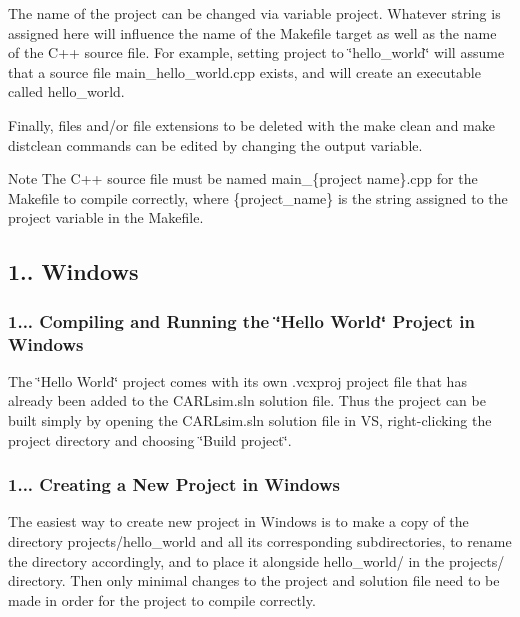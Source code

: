 The name of the project can be changed via variable {\ttfamily project}. Whatever string is assigned here will influence the name of the Makefile target as well as the name of the C++ source file. For example, setting {\ttfamily project} to \char`\"{}hello\+\_\+world\char`\"{} will assume that a source file {\ttfamily main\+\_\+hello\+\_\+world.\+cpp} exists, and will create an executable called {\ttfamily hello\+\_\+world}.

Finally, files and/or file extensions to be deleted with the {\ttfamily make clean} and {\ttfamily make distclean} commands can be edited by changing the {\ttfamily output} variable.

\begin{DoxyNote}{Note}
The C++ source file must be named {\ttfamily main\+\_\+\{project name\}.cpp} for the Makefile to compile correctly, where {\ttfamily \{project\+\_\+name\}} is the string assigned to the {\ttfamily project} variable in the Makefile.
\end{DoxyNote}
\hypertarget{ch1_getting_started_ch1s3s2_windows_project_workflow}{}\subsection{1.. Windows}\label{ch1_getting_started_ch1s3s2_windows_project_workflow}
\hypertarget{ch1_getting_started_ch1s3s2s1_win_hello_world_compile}{}\subsubsection{1... Compiling and Running the \char`\"{}\+Hello World\char`\"{} Project in Windows}\label{ch1_getting_started_ch1s3s2s1_win_hello_world_compile}
The \char`\"{}\+Hello World\char`\"{} project comes with its own {\ttfamily .vcxproj} project file that has already been added to the {\ttfamily C\+A\+R\+Lsim.\+sln} solution file. Thus the project can be built simply by opening the {\ttfamily C\+A\+R\+Lsim.\+sln} solution file in VS, right-\/clicking the project directory and choosing \char`\"{}\+Build project\char`\"{}.\hypertarget{ch1_getting_started_ch1s3s2s1_win_create_new}{}\subsubsection{1... Creating a New Project in Windows}\label{ch1_getting_started_ch1s3s2s1_win_create_new}
The easiest way to create new project in Windows is to make a copy of the directory {\ttfamily projects/hello\+\_\+world} and all its corresponding subdirectories, to rename the directory accordingly, and to place it alongside {\ttfamily hello\+\_\+world/} in the {\ttfamily projects/} directory. Then only minimal changes to the project and solution file need to be made in order for the project to compile correctly.

